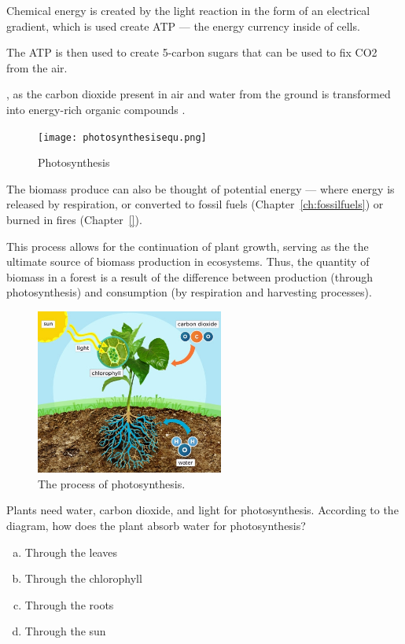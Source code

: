 Chemical energy is created by the light reaction in the form of an electrical gradient, which is used create ATP --- the energy currency inside of cells. 

The ATP is then used to create 5-carbon sugars that can be used to fix CO2 from the air.

, as the carbon dioxide present in air and water from the ground is transformed into energy-rich organic compounds . 
  
   \begin{figure}[ht]
    \centering
        \texttt{[image: photosynthesisequ.png]}
				\caption{Photosynthesis}
				\label{fig:photosynthesis}
    \end{figure}
    
The biomass produce can also be thought of potential energy --- where energy is released by respiration, or converted to fossil fuels (Chapter~\ref{ch:fossilfuels}) or burned in fires (Chapter~\ref{}). 

This process allows for the continuation of plant growth, serving as the the ultimate source of biomass production in ecosystems. Thus, the quantity of biomass in a forest is a result of the difference between production (through photosynthesis) and consumption (by respiration and harvesting processes).

  \begin{figure}[ht]
    \centering
        \includegraphics[width = 0.55\textwidth]{graphics/photosynthesis.jpg}
        \caption{The process of photosynthesis.}
    \end{figure}
    

\begin{problem}
  Plants need water, carbon dioxide, and light for photosynthesis. According to the diagram, how does the plant absorb water for photosynthesis? 
\begin{enumerate}[(a)]
    \item Through the leaves
    \item Through the chlorophyll
    \item Through the roots
    \item Through the sun
\end{enumerate}  


\end{problem}

